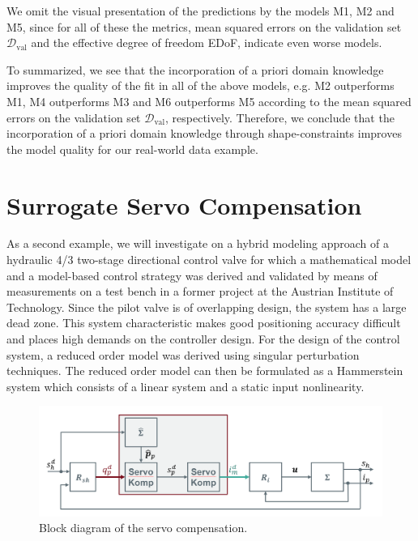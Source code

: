 We omit the visual presentation of the predictions by the models M1, M2 and M5, since for all of these the metrics, mean squared errors on the validation set $\mathcal{D}_{\text{val}}$ and the effective degree of freedom EDoF, indicate even worse models.

To summarized, we see that the incorporation of a priori domain knowledge improves the quality of the fit in all of the above models, e.g. M2 outperforms M1, M4 outperforms M3 and M6 outperforms M5 according to the mean squared errors on the validation set $\mathcal{D}_{\text{val}}$, respectively. Therefore, we conclude that the incorporation of a priori domain knowledge through shape-constraints improves the model quality for our real-world data example. 

\section{Surrogate Servo Compensation} \label{sec:real-world-application2}

As a second example, we will investigate on a hybrid modeling approach of a hydraulic 4/3 two-stage directional control valve for which a mathematical model and a model-based control strategy was derived and validated by means of measurements on a test bench in a former project at the Austrian Institute of Technology. Since the pilot valve is of overlapping design, the system has a large dead zone. This system characteristic makes good positioning accuracy difficult and places high demands on the controller design. For the design of the control system, a reduced order model was derived using singular perturbation techniques. The reduced order model can then be formulated as a Hammerstein system which consists of a linear system and a static input nonlinearity.


\begin{figure}[H]
	\centering
	\includegraphics[width=0.8\columnwidth]{graphics/pgfplots/cha5/Bosch/blockschaltbild.png}
	\caption{Block diagram of the servo compensation.}
	\label{fig:blockschaltbild}
\end{figure}


